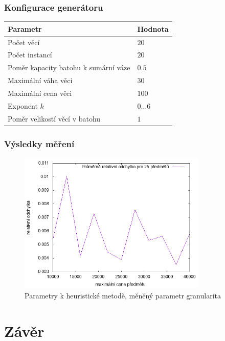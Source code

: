 \documentclass{article}
\begin{document}
\subsubsection*{Konfigurace generátoru}

\begin{table}[H]
\centering
    \begin{tabular}{ |l|l| } 
        \hline
        Parametr & Hodnota \\
        \hline
        \hline
        Počet věcí & $20$ \\
        Počet instancí & $20$ \\
        Poměr kapacity batohu k sumární váze & $0.5$ \\
        Maximální váha věci & $30$ \\
        Maximální cena věci & $100$ \\
        Exponent $k$ & $0 \dots 6$ \\
        Poměr velikostí věcí v batohu & $1$ \\
        \hline
    \end{tabular}
\end{table}

\subsubsection*{Výsledky měření}

\begin{figure}[H]
    \centering
    \includegraphics[width=0.8\textwidth]{inputs-heuristic-price/inputs-heuristic-price.png}
    \caption{Parametry k heuristické metodě, měněný parametr granularita}
    \label{fig:g5}
\end{figure}

\section{Závěr}
\end{document}
